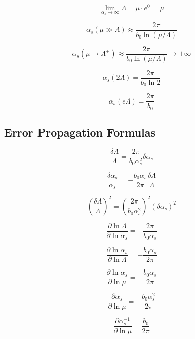 \documentclass[11pt,a4paper]{article}
\theoremstyle{definition}
\begin{document}
\begin{equation}
\label{eq:add-60}
\lim_{\alpha_s\to\infty} \Lambda = \mu \cdot e^{0} = \mu
\end{equation}

\begin{equation}
\label{eq:add-61}
\alpha_s(\mu \gg \Lambda) \approx \frac{2\pi}{b_0\ln(\mu/\Lambda)}
\end{equation}

\begin{equation}
\label{eq:add-62}
\alpha_s(\mu \to \Lambda^+) \approx \frac{2\pi}{b_0\ln(\mu/\Lambda)} \to +\infty
\end{equation}

\begin{equation}
\label{eq:add-63}
\alpha_s(2\Lambda) = \frac{2\pi}{b_0\ln 2}
\end{equation}

\begin{equation}
\label{eq:add-64}
\alpha_s(e\Lambda) = \frac{2\pi}{b_0}
\end{equation}

\subsection{Error Propagation Formulas}
\label{subsec:add-error}

\begin{equation}
\label{eq:add-65}
\frac{\delta\Lambda}{\Lambda} = \frac{2\pi}{b_0\alpha_s^2}\delta\alpha_s
\end{equation}

\begin{equation}
\label{eq:add-66}
\frac{\delta\alpha_s}{\alpha_s} = -\frac{b_0\alpha_s}{2\pi}\frac{\delta\Lambda}{\Lambda}
\end{equation}

\begin{equation}
\label{eq:add-67}
\left(\frac{\delta\Lambda}{\Lambda}\right)^2 = \left(\frac{2\pi}{b_0\alpha_s^2}\right)^2(\delta\alpha_s)^2
\end{equation}

\begin{equation}
\label{eq:add-68}
\frac{\partial\ln\Lambda}{\partial\ln\alpha_s} = -\frac{2\pi}{b_0\alpha_s}
\end{equation}

\begin{equation}
\label{eq:add-69}
\frac{\partial\ln\alpha_s}{\partial\ln\Lambda} = -\frac{b_0\alpha_s}{2\pi}
\end{equation}

\begin{equation}
\label{eq:add-70}
\frac{\partial\ln\alpha_s}{\partial\ln\mu} = -\frac{b_0\alpha_s}{2\pi}
\end{equation}

\begin{equation}
\label{eq:add-71}
\frac{\partial\alpha_s}{\partial\ln\mu} = -\frac{b_0\alpha_s^2}{2\pi}
\end{equation}

\begin{equation}
\label{eq:add-72}
\frac{\partial\alpha_s^{-1}}{\partial\ln\mu} = \frac{b_0}{2\pi}
\end{equation}
\end{document}
